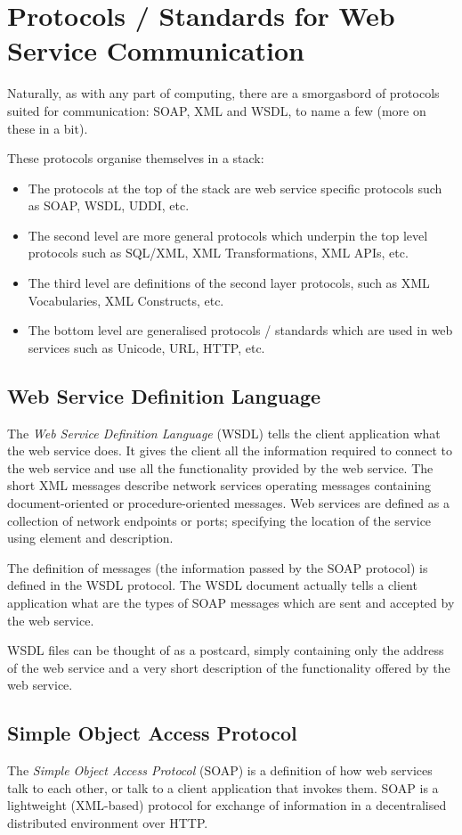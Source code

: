 \section{Protocols / Standards for Web Service Communication}
Naturally, as with any part of computing, there are a smorgasbord of protocols suited for communication: SOAP, XML and WSDL, to name a few (more on these in a bit).

These protocols organise themselves in a stack:
\begin{itemize}
    \item The protocols at the top of the stack are web service specific protocols such as SOAP, WSDL, UDDI, etc.
    \item The second level are more general protocols which underpin the top level protocols such as SQL/XML, XML Transformations, XML APIs, etc.
    \item The third level are definitions of the second layer protocols, such as XML Vocabularies, XML Constructs, etc.
    \item The bottom level are generalised protocols / standards which are used in web services such as Unicode, URL, HTTP, etc.
\end{itemize}

\subsection{Web Service Definition Language}
The \textit{Web Service Definition Language} (WSDL) tells the client application what the web service does. It gives the client all the information required to connect to the web service and use all the functionality provided by the web service. The short XML messages describe network services operating messages containing document-oriented or procedure-oriented messages. Web services are defined as a collection of network endpoints or ports; specifying the location of the service using element and description.

The definition of messages (the information passed by the SOAP protocol) is defined in the WSDL protocol. The WSDL document actually tells a client application what are the types of SOAP messages which are sent and accepted by the web service. 

WSDL files can be thought of as a postcard, simply containing only the address of the web service and a very short description of the functionality offered by the web service. 

\subsection{Simple Object Access Protocol}
The \textit{Simple Object Access Protocol} (SOAP) is a definition of how web services talk to each other, or talk to a client application that invokes them. SOAP is a lightweight (XML-based) protocol for exchange of information in a decentralised distributed environment over HTTP.

